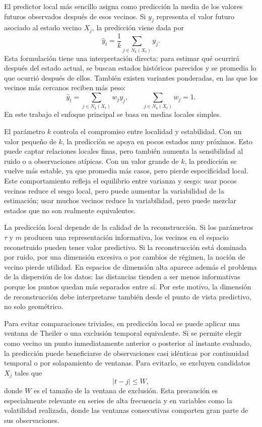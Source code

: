 El predictor local más sencillo asigna como predicción la media de los valores futuros observados después de esos vecinos. Si \(y_j\) representa el valor futuro asociado al estado vecino \(X_j\), la predicción viene dada por
\begin{equation}
    \hat{y}_t=\frac{1}{k}\sum_{j\in N_k(X_t)} y_j.
\end{equation}
Esta formulación tiene una interpretación directa: para estimar qué ocurrirá después del estado actual, se buscan estados históricos parecidos y se promedia lo que ocurrió después de ellos. También existen variantes ponderadas, en las que los vecinos más cercanos reciben más peso:
\begin{equation}
    \hat{y}_t=\sum_{j\in N_k(X_t)} w_j y_j,
    \qquad
    \sum_{j\in N_k(X_t)} w_j = 1.
\end{equation}
En este trabajo el enfoque principal se basa en medias locales simples.

El parámetro \(k\) controla el compromiso entre localidad y estabilidad. Con un valor pequeño de \(k\), la predicción se apoya en pocos estados muy próximos. Esto puede captar relaciones locales finas, pero también aumenta la sensibilidad al ruido o a observaciones atípicas. Con un valor grande de \(k\), la predicción se vuelve más estable, ya que promedia más casos, pero pierde especificidad local. Este comportamiento refleja el equilibrio entre varianza y sesgo: usar pocos vecinos reduce el sesgo local, pero puede aumentar la variabilidad de la estimación; usar muchos vecinos reduce la variabilidad, pero puede mezclar estados que no son realmente equivalentes.

La predicción local depende de la calidad de la reconstrucción. Si los parámetros \(\tau\) y \(m\) producen una representación informativa, los vecinos en el espacio reconstruido pueden tener valor predictivo. Si la reconstrucción está dominada por ruido, por una dimensión excesiva o por cambios de régimen, la noción de vecino pierde utilidad. En espacios de dimensión alta aparece además el problema de la dispersión de los datos: las distancias tienden a ser menos informativas porque los puntos quedan más separados entre sí. Por este motivo, la dimensión de reconstrucción debe interpretarse también desde el punto de vista predictivo, no solo geométrico.

Para evitar comparaciones triviales, en predicción local se puede aplicar una ventana de Theiler o una exclusión temporal equivalente. Si se permite elegir como vecino un punto inmediatamente anterior o posterior al instante evaluado, la predicción puede beneficiarse de observaciones casi idénticas por continuidad temporal o por solapamiento de ventanas. Para evitarlo, se excluyen candidatos \(X_j\) tales que
\begin{equation}
    |t-j|\leq W,
\end{equation}
donde \(W\) es el tamaño de la ventana de exclusión. Esta precaución es especialmente relevante en series de alta frecuencia y en variables como la volatilidad realizada, donde las ventanas consecutivas comparten gran parte de sus observaciones.

